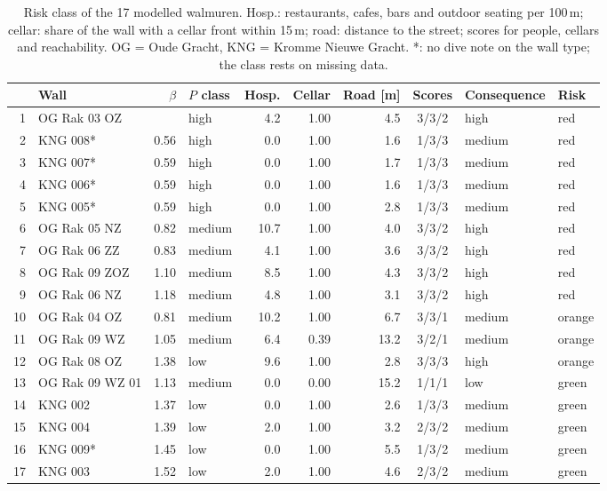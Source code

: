 \begin{table}[htbp]
\centering
\small
\caption{Risk class of the 17 modelled walmuren. Hosp.: restaurants, cafes,
bars and outdoor seating per 100\,m; cellar: share of the wall with a cellar
front within 15\,m; road: distance to the street; scores for people, cellars
and reachability. OG = Oude Gracht, KNG = Kromme Nieuwe Gracht. *: no dive note
on the wall type; the class rests on missing data.}
\label{tab:risk-classes}
\setlength{\tabcolsep}{4pt}
\begin{tabular}{@{}r l r l r r r c l l@{}}
\toprule
 & Wall & $\beta$ & $P$ class & Hosp. & Cellar & Road [m] & Scores & Consequence & Risk \\
\midrule
1 & OG Rak 03 OZ & \textminus0.06 & high & 4.2 & 1.00 & 4.5 & 3/3/2 & high & red \\
2 & KNG 008* & 0.56 & high & 0.0 & 1.00 & 1.6 & 1/3/3 & medium & red \\
3 & KNG 007* & 0.59 & high & 0.0 & 1.00 & 1.7 & 1/3/3 & medium & red \\
4 & KNG 006* & 0.59 & high & 0.0 & 1.00 & 1.6 & 1/3/3 & medium & red \\
5 & KNG 005* & 0.59 & high & 0.0 & 1.00 & 2.8 & 1/3/3 & medium & red \\
6 & OG Rak 05 NZ & 0.82 & medium & 10.7 & 1.00 & 4.0 & 3/3/2 & high & red \\
7 & OG Rak 06 ZZ & 0.83 & medium & 4.1 & 1.00 & 3.6 & 3/3/2 & high & red \\
8 & OG Rak 09 ZOZ & 1.10 & medium & 8.5 & 1.00 & 4.3 & 3/3/2 & high & red \\
9 & OG Rak 06 NZ & 1.18 & medium & 4.8 & 1.00 & 3.1 & 3/3/2 & high & red \\
10 & OG Rak 04 OZ & 0.81 & medium & 10.2 & 1.00 & 6.7 & 3/3/1 & medium & orange \\
11 & OG Rak 09 WZ & 1.05 & medium & 6.4 & 0.39 & 13.2 & 3/2/1 & medium & orange \\
12 & OG Rak 08 OZ & 1.38 & low & 9.6 & 1.00 & 2.8 & 3/3/3 & high & orange \\
13 & OG Rak 09 WZ 01 & 1.13 & medium & 0.0 & 0.00 & 15.2 & 1/1/1 & low & green \\
14 & KNG 002 & 1.37 & low & 0.0 & 1.00 & 2.6 & 1/3/3 & medium & green \\
15 & KNG 004 & 1.39 & low & 2.0 & 1.00 & 3.2 & 2/3/2 & medium & green \\
16 & KNG 009* & 1.45 & low & 0.0 & 1.00 & 5.5 & 1/3/2 & medium & green \\
17 & KNG 003 & 1.52 & low & 2.0 & 1.00 & 4.6 & 2/3/2 & medium & green \\
\bottomrule
\end{tabular}
\end{table}
